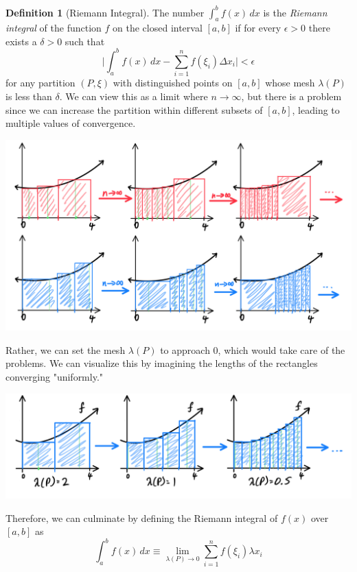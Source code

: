 \documentclass{article}
\theoremstyle{remark}
\theoremstyle{definition}
\newtheorem{definition}{Definition}[section]
\begin{document}
\begin{definition}[Riemann Integral]
The number $\int_a^b f(x)\,dx$ is the \textit{Riemann integral} of the function $f$ on the closed interval $[a, b]$ if for every $\epsilon>0$ there exists a $\delta>0$ such that
\[\Bigg| \int_a^b f(x)\,dx - \sum_{i=1}^n f(\xi_i) \Delta x_i \Bigg| < \epsilon\]
for any partition $(P, \xi)$ with distinguished points on $[a, b]$ whose mesh $\lambda(P)$ is less than $\delta$. We can view this as a limit where $n \rightarrow \infty$, but there is a problem since we can increase the partition within different subsets of $[a,b]$, leading to multiple values of convergence. 
\begin{center}
    \includegraphics[scale=0.28]{img/Riemann_Integral_Converging_onto_2_Numbers.PNG}
\end{center}
Rather, we can set the mesh $\lambda(P)$ to approach $0$, which would take care of the problems. We can visualize this by imagining the lengths of the rectangles converging "uniformly."
\begin{center}
    \includegraphics[scale=0.28]{img/Riemann_Integral_Limit_Mesh_goes_to_0.PNG}
\end{center}
Therefore, we can culminate by defining the Riemann integral of $f(x)$ over $[a,b]$ as 
\[\int_a^b f(x)\,dx \equiv \lim_{\lambda(P) \rightarrow 0} \sum_{i=1}^n f(\xi_i) \lambda x_i\]
\end{definition}
\end{document}
